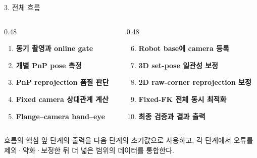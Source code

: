 \documentclass[aspectratio=169,11pt]{beamer}
\begin{document}
\begin{frame}{3. 전체 흐름}
  \begin{columns}[T]
    \begin{column}{0.48\textwidth}
      \begin{enumerate}
        \item \textbf{동기 촬영과 online gate}
        \item \textbf{개별 PnP pose 측정}
        \item \textbf{PnP reprojection 품질 판단}
        \item \textbf{Fixed camera 상대관계 계산}
        \item \textbf{Flange--camera hand--eye}
      \end{enumerate}
    \end{column}
    \begin{column}{0.48\textwidth}
      \begin{enumerate}
        \setcounter{enumi}{5}
        \item \textbf{Robot base에 camera 등록}
        \item \textbf{3D set-pose 일관성 보정}
        \item \textbf{2D raw-corner reprojection 보정}
        \item \textbf{Fixed-FK 전체 동시 최적화}
        \item \textbf{최종 검증과 결과 출력}
      \end{enumerate}
    \end{column}
  \end{columns}

  \vfill
  \begin{alertblock}{흐름의 핵심}
    앞 단계의 출력을 다음 단계의 초기값으로 사용하고, 각 단계에서 오류를 제외·약화·보정한 뒤 더 넓은 범위의
    데이터를 통합한다.
  \end{alertblock}
\end{frame}
\end{document}
